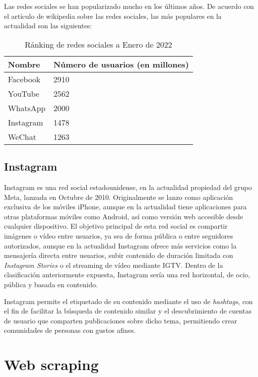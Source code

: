 Las redes sociales se han popularizado mucho en los últimos años. De acuerdo con el artículo de wikipedia sobre las redes sociales, las más populares en la actualidad son las siguientes:

\begin{table}[h]
    \centering
    \begin{tabular}{|l|l|}
        \hline
        Nombre    & Número de usuarios (en millones) \\ \hline
        Facebook  & 2910              \\ \hline
        YouTube   & 2562              \\ \hline
        WhatsApp  & 2000              \\ \hline
        Instagram & 1478              \\ \hline
        WeChat    & 1263              \\ \hline
    \end{tabular}
    \caption{Ránking de redes sociales a Enero de 2022}
    \label{tab:socmed_ranking}
\end{table}

\subsection{Instagram}

Instagram es una red social estadounidense, en la actualidad propiedad del grupo Meta, lanzada en Octubre de 2010. Originalmente se lanzo como aplicación exclusiva de los móviles iPhone, aunque en la actualidad tiene aplicaciones para otras plataformas móviles como Android, así como versión web accesible desde cualquier dispositivo. El objetivo principal de esta red social es compartir imágenes o vídeo entre usuarios, ya sea de forma pública o entre seguidores autorizados, aunque en la actualidad Instagram ofrece más servicios como la mensajería directa entre usuarios, subir contenido de duración limitada con \textit{Instagram Stories} o el streaming de vídeo mediante IGTV. Dentro de la clasificación anteriormente expuesta, Instagram sería una red horizontal, de ocio, pública y basada en contenido.

Instagram permite el etiquetado de su contenido mediante el uso de \textit{hashtags}, con el fin de facilitar la búsqueda de contenido similar y el descubrimiento de cuentas de usuario que comparten publicaciones sobre dicho tema, permitiendo crear comunidades de personas con gustos afines.

\section{Web scraping}

